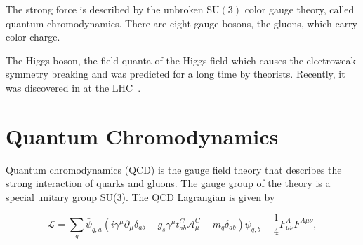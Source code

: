 The strong force is described by the unbroken $\mathrm{SU}(3)$ color gauge
theory, called quantum chromodynamics. There are eight gauge bosons, the gluons,
which carry color charge. 

The Higgs boson, the field quanta of the Higgs field which causes the
electroweak symmetry breaking and  was predicted for a long time by theorists.
Recently, it was discovered in at the LHC~\cite{Chatrchyan:2012xdj,Aad:2012tfa}.





\section{Quantum Chromodynamics}

Quantum chromodynamics (QCD) is the gauge field theory that describes the
strong interaction of quarks and gluons. The gauge group of the theory is a
special unitary group SU(3). The QCD Lagrangian is given by

\begin{equation*}
   \mathcal{L} = \sum_q \bar \psi_{q,a} \left( i \gamma^\mu \partial_\mu
   \delta_{ab} - g_s \gamma^\mu t_{ab}^C \mathcal{A}_{\mu}^C - m_q \delta_{ab}
   \right) \psi_{q,b} - \frac{1}{4} F_{\mu\nu}^{A} F^{A \mu\nu},
\end{equation*}

